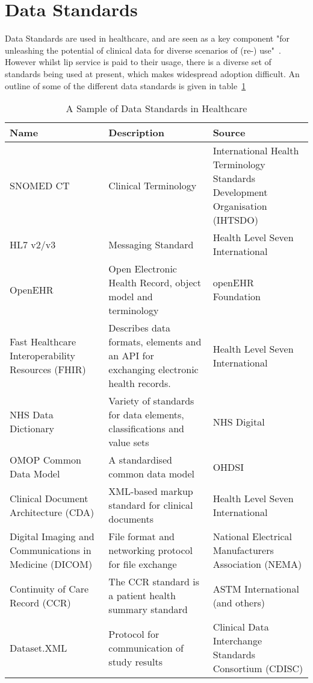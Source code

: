 \documentclass[runningheads]{llncs}
\begin{document}
	\section{Data Standards}
	Data Standards are used in healthcare, and are seen as a key component "for unleashing the potential of clinical data for
   diverse scenarios of (re-) use"~\cite{Schulz2019}. However whilst lip service is paid to their usage, there is a diverse set of standards being used at present, which makes widespread adoption difficult. An outline of some of the different data standards is given in table~\ref{tab:datastandards}
	 \begin{table}[!htbp]
		\begin{center}
			\caption{A Sample of Data Standards in Healthcare}
			\label{tab:datastandards}
			\begin{tabular}{ p{3cm} | p{6cm} | p{5cm }  } 
				\textbf{Name} & \textbf{Description} & \textbf{Source} \\
				\hline
				SNOMED CT & Clinical Terminology&  International Health Terminology Standards Development Organisation (IHTSDO)  \\ 
				\hline
				HL7 v2/v3  & Messaging Standard &  Health Level Seven International \\
				\hline
				OpenEHR  & Open Electronic Health Record, object model and terminology &   openEHR Foundation\\  
				\hline
				Fast Healthcare Interoperability Resources (FHIR) & Describes data formats, elements and an API for exchanging electronic health records.&  Health Level Seven International  \\ 
					\hline
				NHS Data Dictionary &  Variety of standards for data elements, classifications and value sets &  NHS Digital  \\
				\hline
				OMOP Common Data Model  &   A standardised common data model  &  OHDSI \\
				\hline
				Clinical Document Architecture (CDA)  &  XML-based markup standard for clinical documents&  Health Level Seven International   \\ 
				\hline
				Digital Imaging and Communications in Medicine (DICOM)  & File format and networking protocol for file exchange &   National Electrical Manufacturers Association (NEMA)  \\ 
					\hline
				Continuity of Care Record (CCR)  &  The CCR standard is a patient health summary standard &   ASTM International (and others) \\
					\hline
				Dataset.XML  &  Protocol for communication of study results  &   Clinical Data Interchange Standards Consortium (CDISC)  \\

\end{tabular}
\end{center}
\end{table}
\end{document}
